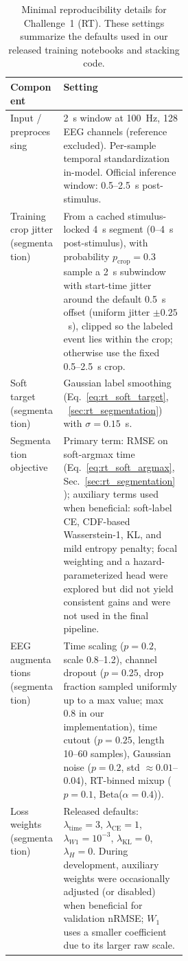 \documentclass[12pt]{article}
\begin{document}
\begin{table}[t!]
\centering
\caption{Minimal reproducibility details for Challenge~1 (RT). These settings summarize the defaults used in our released
training notebooks and stacking code.}
\label{tab:ch1_repro}
\scriptsize
\setlength{\tabcolsep}{6pt}
\renewcommand{\arraystretch}{1.15}
\begin{tabularx}{\linewidth}{@{} p{0.30\linewidth} X @{}}
\toprule
\textbf{Component} & \textbf{Setting} \\
\midrule
Input / preprocessing &
2~s window at 100~Hz, 128 EEG channels (reference excluded). Per-sample temporal standardization in-model. Official
inference window: 0.5--2.5~s post-stimulus. \\

Training crop jitter (segmentation) &
From a cached stimulus-locked 4~s segment (0--4~s post-stimulus), with probability $p_{\text{crop}}{=}0.3$ sample a 2~s
subwindow with start-time jitter around the default 0.5~s offset (uniform jitter $\pm 0.25$~s), clipped so the labeled
event lies within the crop; otherwise use the fixed 0.5--2.5~s crop. \\

Soft target (segmentation) &
Gaussian label smoothing (Eq.~\ref{eq:rt_soft_target}, ~\ref{sec:rt_segmentation}) with $\sigma=0.15$~s. \\

Segmentation objective &
Primary term: RMSE on soft-argmax time (Eq.~\ref{eq:rt_soft_argmax}, Sec.~\ref{sec:rt_segmentation}); auxiliary terms used when beneficial:
soft-label CE, CDF-based Wasserstein-1, KL, and mild entropy penalty; focal weighting and a hazard-parameterized head were explored but did not yield consistent gains and were not used in the final pipeline. \\

EEG augmentations (segmentation) &
Time scaling ($p{=}0.2$, scale 0.8--1.2), channel dropout ($p{=}0.25$, drop fraction sampled uniformly up to a max value; max 0.8 in our implementation), time cutout ($p{=}0.25$, length 10--60 samples), Gaussian noise ($p{=}0.2$, std $\approx 0.01$--0.04), RT-binned mixup
($p{=}0.1$, Beta($\alpha{=}0.4$)). \\

Loss weights (segmentation) &
Released defaults:
$\lambda_{\text{time}}=3$,
$\lambda_{\text{CE}}=1$,
$\lambda_{W1}=10^{-3}$,
$\lambda_{\text{KL}}=0$,
$\lambda_{H}=0$.
During development, auxiliary weights were occasionally adjusted (or disabled) when beneficial for validation nRMSE;
$W_1$ uses a smaller coefficient due to its larger raw scale. \\


\end{tabularx}
\end{table}
\end{document}
